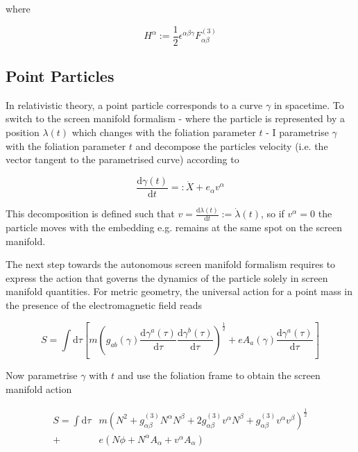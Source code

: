 \documentclass[11pt]{article}
\begin{document}
where 

\begin{equation} \label{def_H_alpha}
	H^\alpha := \frac{1}{2}\epsilon^{\alpha \beta \gamma} F^{(3)}_{\alpha \beta} 
\end{equation}


\subsection{Point Particles} \label{sec_pp_met}

In relativistic theory, a point particle corresponds to a curve $\gamma$ in spacetime. To switch to the screen manifold formalism - where the particle is represented by a position $\lambda (t) $ which changes with the foliation parameter $t$ - I parametrise $\gamma$ with the foliation parameter $t$ and decompose the particles velocity (i.e. the vector tangent to the parametrised curve) according to

\begin{equation}
	\frac{\mathrm{d} \gamma (t)}{\mathrm{d} t } =: \dot{X} +  e_\alpha v^\alpha
\end{equation}

This decomposition is defined such that $v = 	\frac{\mathrm{d} \lambda (t)}{\mathrm{d} t } := \dot{\lambda} (t) $, so if $ v^\alpha = 0 $ the particle  moves with the embedding e.g. remains at the same spot on the screen manifold.

The next step towards the autonomous screen manifold formalism requires to express the action that governs the dynamics of the particle solely in screen manifold quantities. For metric geometry, the universal action for a point mass in the presence of the electromagnetic field reads

\begin{equation}
	S = \int \mathrm{d}\tau  \left[
	m \left( 
	g_{a b}\left( \gamma \right)
	\frac{\mathrm{d} \gamma^a\left( \tau \right) }{\mathrm{d}\tau}
	\frac{\mathrm{d} \gamma^b\left( \tau \right) }{\mathrm{d}\tau} \right)^{\frac{1}{2}}
	+ e A_a \left( \gamma  \right) 
	\frac{\mathrm{d} \gamma^a\left( \tau \right) }{\mathrm{d}\tau} 
	\right]
\end{equation}

Now parametrise $\gamma$ with $t$ and use the foliation frame to obtain the screen manifold action

\begin{equation}
\begin{split}
	S = \int \mathrm{d}\tau
	& m \left( 
	N^2 + g^{(3)}_{\alpha \beta} N^{\alpha} N^{\beta}
	+ 2 g^{(3)}_{\alpha \beta} v^\alpha N^\beta + g^{(3)}_{\alpha \beta} v^\alpha v^\beta 
	\right)^{\frac{1}{2}} \\
	+ \, & e \left( N \phi + N^\alpha A_\alpha + v^\alpha A_\alpha \right)
\end{split}
\end{equation}
\end{document}
